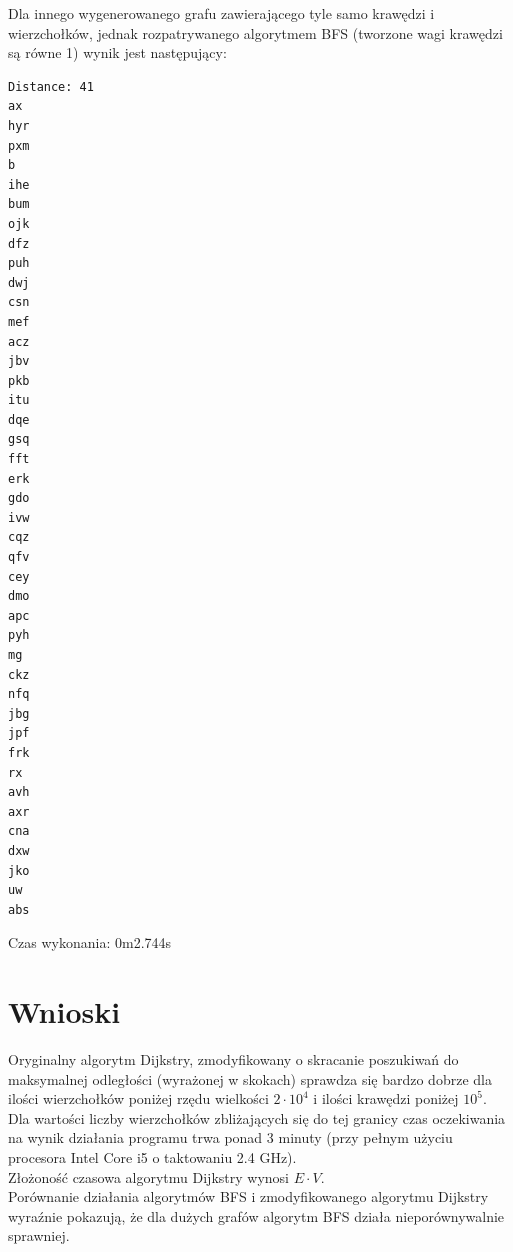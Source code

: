 \documentclass[a4paper, 12pt]{article}
\begin{document}
Dla innego wygenerowanego grafu zawierającego tyle samo krawędzi i wierzchołków, jednak rozpatrywanego algorytmem BFS (tworzone wagi krawędzi są równe 1) wynik jest następujący:
\begin{multicols}{2}
\begin{verbatim}
Distance: 41
ax
hyr
pxm
b
ihe
bum
ojk
dfz
puh
dwj
csn
mef
acz
jbv
pkb
itu
dqe
gsq
fft
erk
gdo
ivw
cqz
qfv
cey
dmo
apc
pyh
mg
ckz
nfq
jbg
jpf
frk
rx
avh
axr
cna
dxw
jko
uw
abs
\end{verbatim}
\end{multicols}
Czas wykonania: 0m2.744s
\section{Wnioski}
Oryginalny algorytm Dijkstry, zmodyfikowany o skracanie poszukiwań do maksymalnej odległości (wyrażonej w skokach) sprawdza się bardzo dobrze dla ilości wierzchołków poniżej rzędu wielkości $2 \cdot 10^4$ i ilości krawędzi poniżej $10^5$.
Dla wartości liczby wierzchołków zbliżających się do tej granicy czas oczekiwania na wynik działania programu trwa ponad 3 minuty (przy pełnym użyciu procesora Intel Core i5 o taktowaniu 2.4 GHz).\\
Złożoność czasowa algorytmu Dijkstry wynosi $E \cdot V$.\\
Porównanie działania algorytmów BFS i zmodyfikowanego algorytmu Dijkstry wyraźnie pokazują, że dla dużych grafów algorytm BFS działa nieporównywalnie sprawniej.
\end{document}
